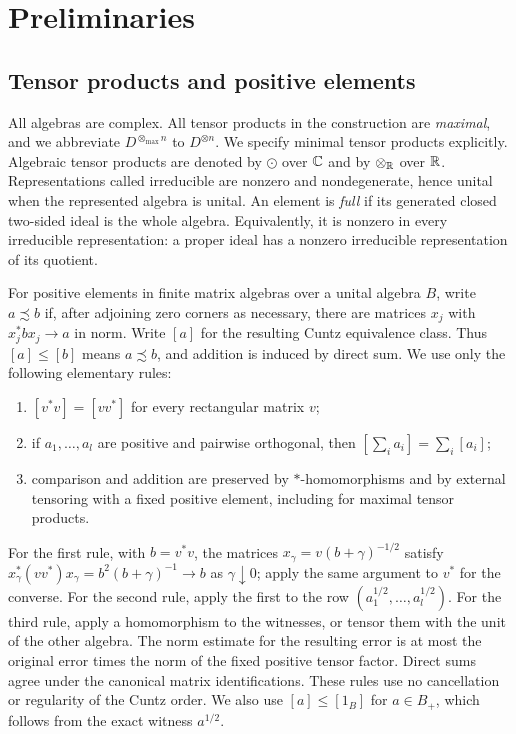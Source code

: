 \section{Preliminaries}\label{sec:preliminaries}

\subsection{Tensor products and positive elements}
All algebras are complex. All tensor products in the construction are
\emph{maximal}, and we abbreviate $D^{\otimes_{\max}n}$ to $D^{\otimes n}$.
We specify minimal tensor products explicitly. Algebraic tensor products
are denoted by $\odot$ over $\mathbb C$ and by $\otimes_{\mathbb R}$ over $\mathbb R$.
Representations called irreducible are nonzero and nondegenerate, hence
unital when the represented algebra is unital. An element is \emph{full}
if its generated closed two-sided ideal is the whole algebra. Equivalently,
it is nonzero in every irreducible representation: a proper ideal has a
nonzero irreducible representation of its quotient.

For positive elements in finite matrix algebras over a unital algebra $B$,
write $a\precsim b$ if, after adjoining zero corners as necessary, there
are matrices $x_j$ with $x_j^*b x_j\to a$ in norm. Write $[a]$ for the
resulting Cuntz equivalence class. Thus $[a]\le[b]$ means
$a\precsim b$, and addition is induced by direct sum. We use only the
following elementary rules:
\begin{enumerate}
\item $[v^*v]=[vv^*]$ for every rectangular matrix $v$;
\item if $a_1,\ldots,a_l$ are positive and pairwise orthogonal, then
$[\sum_i a_i]=\sum_i[a_i]$;
\item comparison and addition are preserved by $*$-homomorphisms and by
external tensoring with a fixed positive element, including for maximal
tensor products.
\end{enumerate}
For the first rule, with $b=v^*v$, the matrices
$x_\gamma=v(b+\gamma)^{-1/2}$ satisfy
$x_\gamma^*(vv^*)x_\gamma=b^2(b+\gamma)^{-1}\to b$ as
$\gamma\downarrow0$; apply the same argument to $v^*$ for the converse.
For the second rule, apply the first to the row
$(a_1^{1/2},\ldots,a_l^{1/2})$. For the third rule, apply a homomorphism to
the witnesses, or tensor them with the unit of the other algebra. The norm
estimate for the resulting error is at most the original error times the
norm of the fixed positive tensor factor. Direct sums agree under the
canonical matrix identifications. These rules use no cancellation or
regularity of the Cuntz order. We also use $[a]\le[1_B]$ for $a\in B_+$,
which follows from the exact witness $a^{1/2}$.


